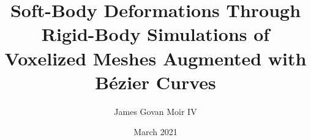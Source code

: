 \documentclass[12pt,american]{report}
\begin{document}
\title{\vspace{-0.20in}Soft-Body Deformations Through Rigid-Body Simulations of Voxelized Meshes Augmented with Bézier Curves}
\MSprojectfalse
\date{March 2021}

\author{James Govan Moir IV}



\copyrightfalse%
{}

\beforepreface%
\end{document}
